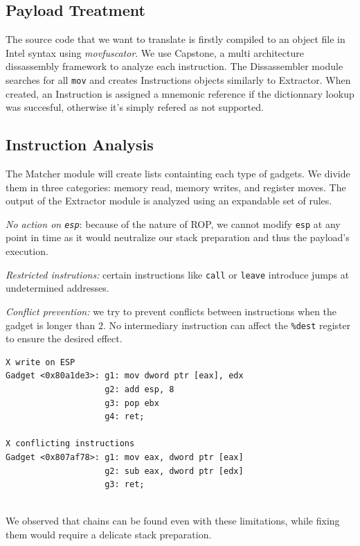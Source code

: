 \documentclass[10pt,twocolumn]{article}
\begin{document}
\subsection{Payload Treatment}

The source code that we want to translate is firstly compiled to an object file
in Intel syntax using \textit{movfuscator}.  We use
Capstone\cite{quynh_capstone}, a multi architecture dissassembly framework to
analyze each instruction. The Dissassembler module searches for all
\texttt{mov} and creates Instructions objects similarly to Extractor. When
created, an Instruction is assigned a mnemonic reference if the dictionnary
lookup was succesful, otherwise it's simply refered as not supported.

\subsection{Instruction Analysis}

The Matcher module will create lists containting each type of gadgets. We
divide them in three categories: memory read, memory writes, and register
moves. The output of the Extractor module is analyzed using an expandable set
of rules.

\textit{No action on \texttt{esp}}: because of the nature of ROP, we cannot
modify \texttt{esp} at any point in time as it would neutralize our stack
preparation and thus the payload's execution.

\textit{Restricted instrutions:} certain instructions like \texttt{call} or
\texttt{leave} introduce jumps at undetermined addresses.

\textit{Conflict prevention:} we try to prevent conflicts between instructions when the
gadget is longer than $2$. No intermediary instruction can affect the
\texttt{\%dest} register to ensure the desired effect.


\begin{lstlisting}[float=h,aboveskip=\medskipamount,belowskip=0pt]
X write on ESP
Gadget <0x80a1de3>: g1: mov dword ptr [eax], edx
                    g2: add esp, 8
                    g3: pop ebx
                    g4: ret;

X conflicting instructions
Gadget <0x807af78>: g1: mov eax, dword ptr [eax]
                    g2: sub eax, dword ptr [edx]
                    g3: ret;


\end{lstlisting}

We observed that chains can be found even with these limitations, while fixing
them would require a delicate stack preparation.
\end{document}
